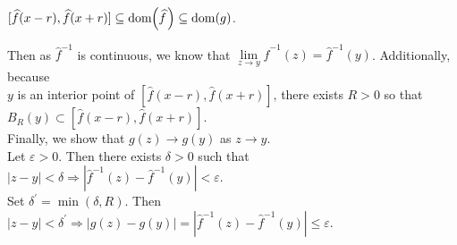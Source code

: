 \documentclass{book}
\newenvironment{myIndent}{%
   \begin{adjustwidth}{2.5em}{0em}%
}{%
   \end{adjustwidth}%
}
\newcommand{\domain}[1]{\mathrm{dom}(#1)}
\newcommand{\retTwo}{\hfill\bigbreak}
\begin{document}
{\begin{myIndent}
   {\centering $[\widehat{f}(x - r), \widehat{f}(x + r)] \subseteq \mathrm{dom}\hspace{-0.2em}\left(\widehat{f}\hspace{0.09em}\right) \subseteq \domain{g}$.\retTwo\par}
   
   Then as $\widehat{f}^{-1}$ is continuous, we know that $\lim\limits_{z\rightarrow y}\widehat{f}^{-1}(z) = \widehat{f}^{-1}(y)$. Additionally, because\\ [-3pt] $y$ is an interior point of ${[\widehat{f}(x - r), \widehat{f}(x + r)]\text{,}}$ there exists $R > 0$ so that\\ [4pt] $B_R(y) \subset [\widehat{f}(x - r), \widehat{f}(x + r)]$.\\ [6pt]
   
   Finally, we show that $g(z) \rightarrow g(y)$ as $z \rightarrow y$.\\ Let $\varepsilon > 0$. Then there exists $\delta > 0$ such that ${|z - y| < \delta \Longrightarrow |\widehat{f}^{-1}(z) - \widehat{f}^{-1}(y)| < \varepsilon\text{.}}$\\ Set $\delta^\prime = \min(\delta, R)$. Then $|z - y| < \delta^\prime \Longrightarrow |g(z) - g(y)| = |\widehat{f}^{-1}(z) - \widehat{f}^{-1}(y)| \leq \varepsilon$.
\end{myIndent}}

\newpage
\end{document}

